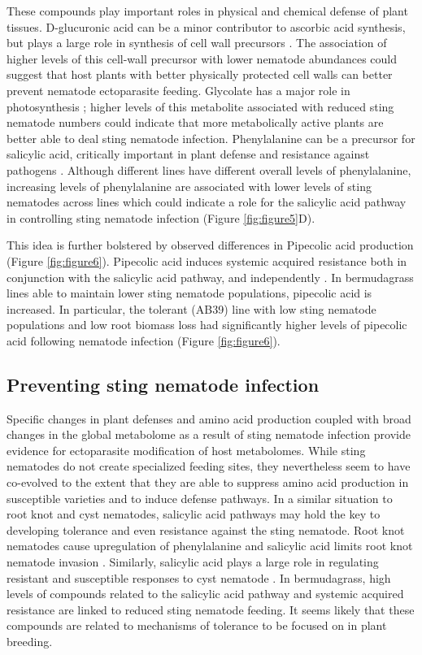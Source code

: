 \documentclass[9pt,lineno]{elife}
\begin{document}
These compounds play important roles in physical and chemical defense of plant tissues.  D-glucuronic acid can be a minor contributor to ascorbic acid synthesis, but plays a large role in synthesis of cell wall precursors \citep{valpuesta2004biosynthesis}.  The association of higher levels of this cell-wall precursor with lower nematode abundances could suggest that host plants with better physically protected cell walls can better prevent nematode ectoparasite feeding. Glycolate has a major role in photosynthesis \citep{tolbert1997c2}; higher levels of this metabolite associated with reduced sting nematode numbers could indicate that more metabolically active plants are better able to deal sting nematode infection.  Phenylalanine can be a precursor for salicylic acid, critically important in plant defense and resistance against pathogens \citep{raskin1992role,delaney1994central,mauch1996production}. Although different lines have different overall levels of phenylalanine, increasing levels of phenylalanine are associated with lower levels of sting nematodes across lines which could indicate a role for the salicylic acid pathway in controlling sting nematode infection (Figure \ref{fig:figure5}D).  

This idea is further bolstered by observed differences in Pipecolic acid production (Figure \ref{fig:figure6}).  Pipecolic acid induces systemic acquired resistance both in conjunction with the salicylic acid pathway, and independently \citep{shan2018pipped,wang2018pipecolic}. In bermudagrass lines able to maintain lower sting nematode populations, pipecolic acid is increased.  In particular, the tolerant (AB39) line with low sting nematode populations and low root biomass loss had significantly higher levels of pipecolic acid following nematode infection (Figure \ref{fig:figure6}).    

\subsection{Preventing sting nematode infection}
Specific changes in plant defenses and amino acid production coupled with broad changes in the global metabolome as a result of sting nematode infection provide evidence for ectoparasite modification of host metabolomes.  While sting nematodes do not create specialized feeding sites, they nevertheless seem to have co-evolved to the extent that they are able to suppress amino acid production in susceptible varieties and to induce defense pathways.  In a similar situation to root knot and cyst nematodes, salicylic acid pathways may hold the key to developing tolerance and even resistance against the sting nematode.  Root knot nematodes cause upregulation of phenylalanine and salicylic acid limits root knot nematode invasion \citep{eloh2016untargeted}.  Similarly, salicylic acid plays a large role in regulating resistant and susceptible responses to cyst nematode \citep{uehara2010resistant, martinez2017shifting}.  In bermudagrass, high levels of compounds related to the salicylic acid pathway and systemic acquired resistance are linked to reduced sting nematode feeding.  It seems likely that these compounds are related to mechanisms of tolerance to be focused on in plant breeding. 
\end{document}
